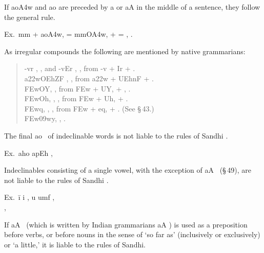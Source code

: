 If {\dn ao\3A4w}  and {\dn ao}  are preceded by {\dn a} or {\dn aA}
 in the middle of a sentence, they follow the general
rule.

Ex.\ {\dn mm} + {\dn ao\3A4w,} = {\dn mmO\3A4w,}  +  =
, .

\s As irregular compounds the following are mentioned by native
grammarians:

\begin{quote}
  {\dn -v\4r\2} , , and {\dn -v\4Er}
  , , from {\dn -v} + {\dn Ir}  +
  .\\
  {\dn a\322wOEhZF} , , from {\dn a\322w} +
  {\dn UEhnF}  + .\\
  {\dn \3FEwOY,} , from {\dn \3FEw} + {\dn UY,}  +
  , .\\
  {\dn \3FEwOh,} , , from {\dn \3FEw} + {\dn Uh,}
   + .\\
  {\dn \3FEw\4q,} , , from {\dn \3FEw} +
  {\dn eq,}  + . (See \S\,43.)\\
  {\dn \3FEw\4\309wy,} , .
\end{quote}

\s The final {\dn ao}~ of indeclinable words is not liable to the rules
of Sandhi .

Ex.\ {\dn aho ap\?Eh} , 

\s Indeclinables consisting of a single vowel, with the exception of
{\dn aA}~ (\S\,49), are not liable to the rules of Sandhi
.

\begin{tabbing}
  Ex.\ \={\dn i i\2} ,  {\dn u um\?f} ,
  \\
   , 
\end{tabbing}

\s If {\dn aA}~ (which is written by Indian grammarians {\dn aA}
) is used as a preposition before verbs, or before nouns in the
sense of `so far as' (inclusively or exclusively) or `a little,' it is
liable to the rules of Sandhi.

